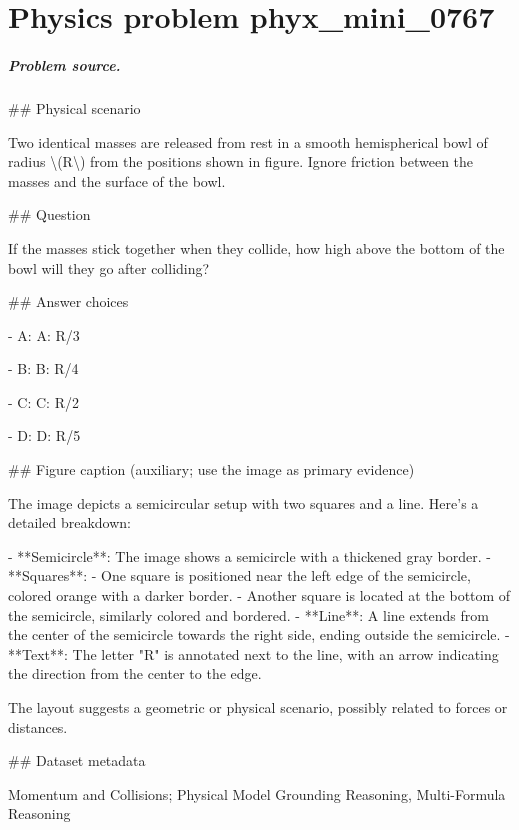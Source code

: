 
\chapter{Physics problem phyx\_mini\_0767}
\label{ch:PhyXMiniProblems_problem_phyx_mini_0767}

\paragraph{Problem source.}
\#\# Physical scenario

Two identical masses are released from rest in a smooth hemispherical bowl of radius \textbackslash{}(R\textbackslash{}) from the positions shown in figure. Ignore friction between the masses and the surface of the bowl.

\#\# Question

If the masses stick together when they collide, how high above the bottom of the bowl will they go after colliding?

\#\# Answer choices

- A: A: R/3

- B: B: R/4

- C: C: R/2

- D: D: R/5

\#\# Figure caption (auxiliary; use the image as primary evidence)

The image depicts a semicircular setup with two squares and a line. Here's a detailed breakdown:

- **Semicircle**: The image shows a semicircle with a thickened gray border.
- **Squares**: 
  - One square is positioned near the left edge of the semicircle, colored orange with a darker border.
  - Another square is located at the bottom of the semicircle, similarly colored and bordered.
- **Line**: A line extends from the center of the semicircle towards the right side, ending outside the semicircle. 
- **Text**: The letter "R" is annotated next to the line, with an arrow indicating the direction from the center to the edge.

The layout suggests a geometric or physical scenario, possibly related to forces or distances.

\#\# Dataset metadata

Momentum and Collisions; Physical Model Grounding Reasoning, Multi-Formula Reasoning

